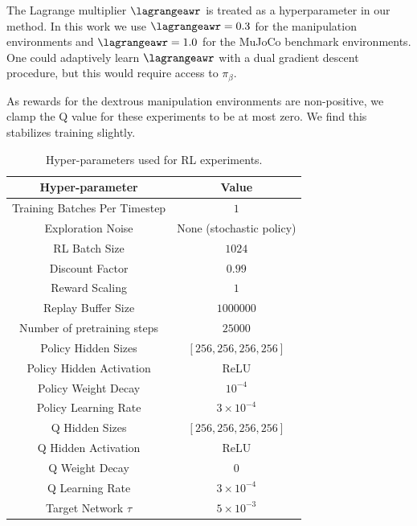 
The Lagrange multiplier $\lagrangeawr$ is treated as a hyperparameter in our method. In this work we use $\lagrangeawr = 0.3$ for the manipulation environments and $\lagrangeawr = 1.0$ for the MuJoCo benchmark environments. One could adaptively learn $\lagrangeawr$ with a dual gradient descent procedure, but this would require access to $\pi_\beta$.

As rewards for the dextrous manipulation environments are non-positive, we clamp the Q value for these experiments to be at most zero. We find this stabilizes training slightly.

\begin{table}
    \centering
    \begin{tabular}{c|c}
    \hline
    \textbf{Hyper-parameter} & \textbf{Value} \\
    \hline
    Training Batches Per Timestep & $1$\\
    Exploration Noise & None (stochastic policy) \\
    RL Batch Size & $1024$ \\
    Discount Factor & $0.99$\\
    Reward Scaling & $1$\\
    Replay Buffer Size & $1000000$\\
    Number of pretraining steps & $25000$ \\
    Policy Hidden Sizes & $[256, 256, 256, 256]$\\
    Policy Hidden Activation & ReLU\\
    Policy Weight Decay & $10^{-4}$ \\
    Policy Learning Rate & $3 \times 10^{-4}$\\
    Q Hidden Sizes & $[256, 256, 256, 256]$\\
    Q Hidden Activation & ReLU\\
    Q Weight Decay & $0$ \\
    Q Learning Rate & $3 \times 10^{-4}$\\
    Target Network $\tau$ & $5\times10^{-3}$ \\
    \hline
    \end{tabular}
\caption{Hyper-parameters used for RL experiments.}
\label{table:rl-hyperparams}
\end{table}

